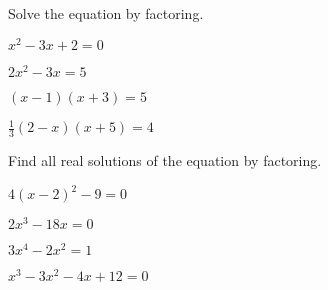 \vfill
\begin{center} \hfill
\end{center}


\newpage

\begin{exercise}
	Solve the equation by factoring.

	\noindent
	\begin{enumerate*}[label={(\arabic*)~}]
		\item $x^2-3x+2=0$
		\item $2x^2-3x=5$
		\item $(x-1)(x+3)=5$
		\item $\frac13(2-x)(x+5)=4$
		\hfill\null
	\end{enumerate*}
\end{exercise}

\begin{center} \hfill
\end{center}

\begin{exercise}
	Find all real solutions of the equation by factoring.

	\noindent
	\begin{enumerate*}[label={(\arabic*)~}]
		\item $4(x-2)^2-9=0$
		\item $2x^3-18x=0$
		\item $3x^4-2x^2=1$
		\item $x^3-3x^2-4x+12=0$
		\hfill\null
	\end{enumerate*}
\end{exercise}

